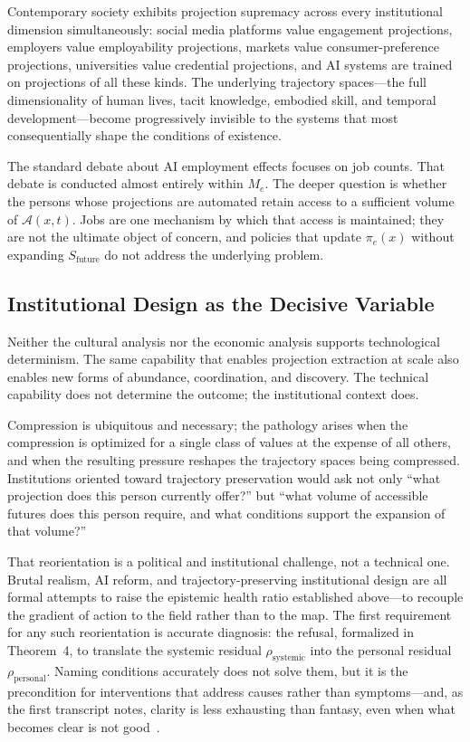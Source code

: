 \documentclass[12pt, a4paper]{article}
\theoremstyle{plain}
\theoremstyle{definition}
\theoremstyle{remark}
\begin{document}
Contemporary society exhibits projection supremacy across every institutional dimension
simultaneously: social media platforms value engagement projections, employers value
employability projections, markets value consumer-preference projections, universities
value credential projections, and AI systems are trained on projections of all these kinds.
The underlying trajectory spaces---the full dimensionality of human lives, tacit knowledge,
embodied skill, and temporal development---become progressively invisible to the systems
that most consequentially shape the conditions of existence.

The standard debate about AI employment effects focuses on job counts.
That debate is conducted almost entirely within $M_e$.
The deeper question is whether the persons whose projections are automated retain
access to a sufficient volume of $\mathcal{A}(x,t)$.
Jobs are one mechanism by which that access is maintained; they are not the ultimate
object of concern, and policies that update $\pi_e(x)$ without expanding
$S_{\mathrm{future}}$ do not address the underlying problem.

\subsection{Institutional Design as the Decisive Variable}

Neither the cultural analysis nor the economic analysis supports technological determinism.
The same capability that enables projection extraction at scale also enables
new forms of abundance, coordination, and discovery.
The technical capability does not determine the outcome; the institutional context does.

Compression is ubiquitous and necessary; the pathology arises when the compression
is optimized for a single class of values at the expense of all others, and when the
resulting pressure reshapes the trajectory spaces being compressed.
Institutions oriented toward trajectory preservation would ask not only
``what projection does this person currently offer?'' but ``what volume of accessible
futures does this person require, and what conditions support the expansion of that volume?''

That reorientation is a political and institutional challenge, not a technical one.
Brutal realism, AI reform, and trajectory-preserving institutional design are all
formal attempts to raise the epistemic health ratio established above---to recouple
the gradient of action to the field rather than to the map.
The first requirement for any such reorientation is accurate diagnosis: the refusal,
formalized in Theorem~4, to translate the systemic residual $\rho_{\mathrm{systemic}}$
into the personal residual $\rho_{\mathrm{personal}}$.
Naming conditions accurately does not solve them, but it is the precondition
for interventions that address causes rather than symptoms---and, as the first
transcript notes, clarity is less exhausting than fantasy, even when what becomes
clear is not good~\cite{brutrealism}.
\end{document}
